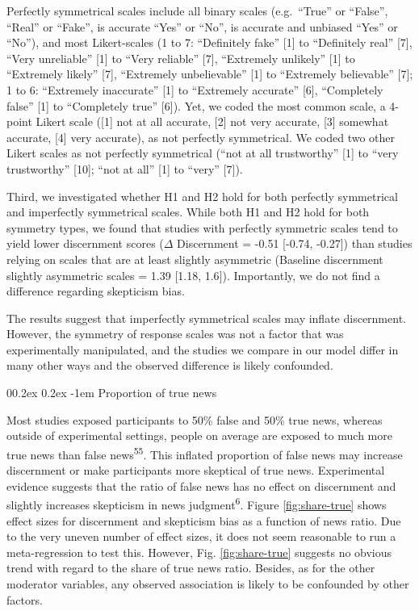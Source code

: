 \documentclass[
  man]{apa6}
\makeatletter
\let\oldparagraph\paragraph
\renewcommand{\paragraph}{
    \@ifstar
      \xxxParagraphStar
      \xxxParagraphNoStar
  }
\newcommand{\xxxParagraphStar}[1]{\oldparagraph*{#1}\mbox{}}
\newcommand{\xxxParagraphNoStar}[1]{\oldparagraph{#1}\mbox{}}
\renewcommand{\paragraph}{\@startsection{paragraph}{4}{\parindent}%
  {0\baselineskip \@plus 0.2ex \@minus 0.2ex}%
  {-1em}%
  {\normalfont\normalsize\bfseries\itshape\typesectitle}}
\makeatother
\begin{document}
Perfectly symmetrical scales include all binary scales (e.g.~``True'' or ``False'', ``Real'' or ``Fake'', is accurate ``Yes'' or ``No'', is accurate and unbiased ``Yes'' or ``No''), and most Likert-scales (1 to 7: ``Definitely fake'' {[}1{]} to ``Definitely real'' {[}7{]}, ``Very unreliable'' {[}1{]} to ``Very reliable'' {[}7{]}, ``Extremely unlikely'' {[}1{]} to ``Extremely likely'' {[}7{]}, ``Extremely unbelievable'' {[}1{]} to ``Extremely believable'' {[}7{]}; 1 to 6: ``Extremely inaccurate'' {[}1{]} to ``Extremely accurate'' {[}6{]}, ``Completely false'' {[}1{]} to ``Completely true'' {[}6{]}). Yet, we coded the most common scale, a 4-point Likert scale ({[}1{]} not at all accurate, {[}2{]} not very accurate, {[}3{]} somewhat accurate, {[}4{]} very accurate), as not perfectly symmetrical. We coded two other Likert scales as not perfectly symmetrical (``not at all trustworthy'' {[}1{]} to ``very trustworthy'' {[}10{]}; ``not at all'' {[}1{]} to ``very'' {[}7{]}).

Third, we investigated whether H1 and H2 hold for both perfectly symmetrical and imperfectly symmetrical scales. While both H1 and H2 hold for both symmetry types, we found that studies with perfectly symmetric scales tend to yield lower discernment scores (\(\Delta\) Discernment = -0.51 {[}-0.74, -0.27{]}) than studies relying on scales that are at least slightly asymmetric (Baseline discernment slightly asymmetric scales = 1.39 {[}1.18, 1.6{]}). Importantly, we do not find a difference regarding skepticism bias.

The results suggest that imperfectly symmetrical scales may inflate discernment. However, the symmetry of response scales was not a factor that was experimentally manipulated, and the studies we compare in our model differ in many other ways and the observed difference is likely confounded.

\paragraph{Proportion of true news}\label{proportion-of-true-news}

Most studies exposed participants to 50\% false and 50\% true news, whereas outside of experimental settings, people on average are exposed to much more true news than false news\textsuperscript{55}. This inflated proportion of false news may increase discernment or make participants more skeptical of true news. Experimental evidence suggests that the ratio of false news has no effect on discernment and slightly increases skepticism in news judgment\textsuperscript{6}. Figure \ref{fig:share-true} shows effect sizes for discernment and skepticism bias as a function of news ratio. Due to the very uneven number of effect sizes, it does not seem reasonable to run a meta-regression to test this. However, Fig. \ref{fig:share-true} suggests no obvious trend with regard to the share of true news ratio. Besides, as for the other moderator variables, any observed association is likely to be confounded by other factors.
\end{document}
